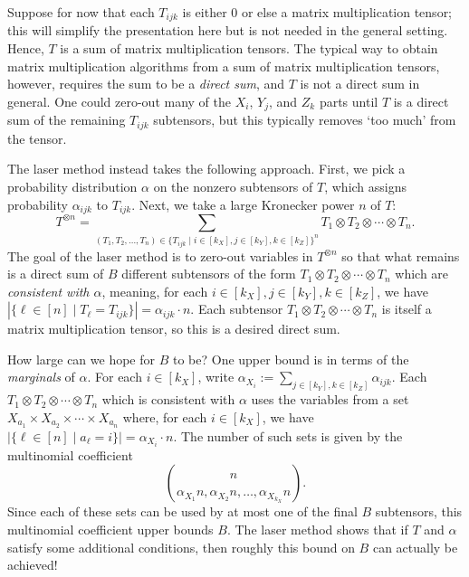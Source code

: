 \documentclass{theoretics}
\begin{document}
Suppose for now that each $T_{ijk}$ is either $0$ or else a matrix multiplication tensor; this will simplify the presentation here but is not needed in the general setting. Hence, $T$ is a sum of matrix multiplication tensors. The typical way to obtain matrix multiplication algorithms from a sum of matrix multiplication tensors, however, requires the sum to be a {\em direct sum}, and $T$ is not a direct sum in general.
One could zero-out many of the $X_i$, $Y_j$, and $Z_k$ parts until $T$ is a direct sum of the remaining $T_{ijk}$ subtensors, but this typically removes `too much' from the tensor. 

The laser method instead takes the following approach. First, we pick a probability distribution $\alpha$ on the nonzero subtensors of $T$, which assigns probability $\alpha_{ijk}$ to $T_{ijk}$. Next, we take a large Kronecker power $n$ of $T$: $$T^{\otimes n} = \sum_{(T_1, T_2, \ldots, T_n) \in \{T_{ijk} \mid i \in [k_X], j \in [k_Y], k \in [k_Z]\}^n} T_1 \otimes T_2 \otimes \cdots \otimes T_n.$$ The goal of the laser method is to zero-out variables in $T^{\otimes n}$ so that what remains is a direct sum of $B$ different subtensors of the form $T_1 \otimes T_2 \otimes \cdots \otimes T_n$ which are \emph{consistent with $\alpha$}, meaning, for each $i \in [k_X], j \in [k_Y], k \in [k_Z]$, we have $|\{ \ell \in [n] \mid T_\ell = T_{ijk}\}| = \alpha_{ijk} \cdot n$. Each subtensor $T_1 \otimes T_2 \otimes \cdots \otimes T_n$ is itself a matrix multiplication tensor, so this is a desired direct sum. 

How large can we hope for $B$ to be? One upper bound is in terms of the \emph{marginals} of $\alpha$. For each $i \in [k_X]$, write $\alpha_{X_i} := \sum_{j \in [k_Y], k \in [k_Z]} \alpha_{ijk}$. Each $T_1 \otimes T_2 \otimes \cdots \otimes T_n$ which is consistent with $\alpha$ uses the variables from a set $X_{a_1} \times X_{a_2} \times \cdots \times X_{a_n}$ where, for each $i \in [k_X]$, we have $|\{ \ell \in [n] \mid a_\ell = i\}| = \alpha_{X_i} \cdot n$. The number of such sets is given by the multinomial coefficient $$\binom{n}{\alpha_{X_1}n, \alpha_{X_2}n, \ldots, \alpha_{X_{k_X}}n}.$$
Since each of these sets can be used by at most one of the final $B$ subtensors, this multinomial coefficient upper bounds $B$. The laser method shows that if $T$ and $\alpha$ satisfy some additional conditions, then roughly this bound on $B$ can actually be achieved!
\end{document}
